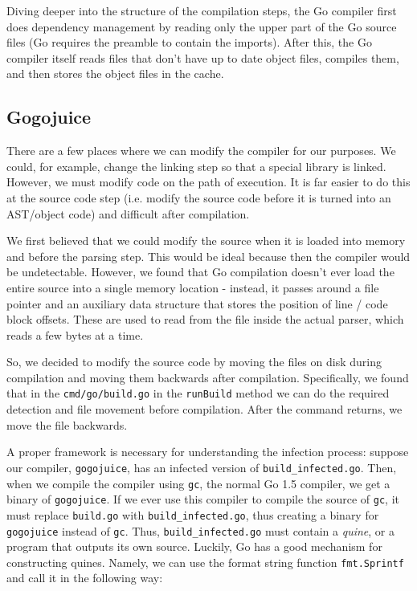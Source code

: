 \documentclass[10pt]{sigplanconf}
\begin{document}
Diving deeper into the structure of the compilation steps, the Go compiler first does dependency management by reading only the upper part of the Go source files (Go requires the preamble to contain the imports). After this, the Go compiler itself reads files that don't have up to date object files, compiles them, and then stores the object files in the cache. 

\subsection{Gogojuice}
There are a few places where we can modify the compiler for our purposes. We could, for example, change the linking step so that a special library is linked. However, we must modify code on the path of execution. It is far easier to do this at the source code step (i.e. modify the source code before it is turned into an AST/object code) and difficult after compilation. 

\smallskip

We first believed that we could modify the source when it is loaded into memory and before the parsing step. This would be ideal because then the compiler would be undetectable. However, we found that Go compilation doesn't ever load the entire source into a single memory location - instead, it passes around a file pointer and an auxiliary data structure that stores the position of line / code block offsets. These are used to read from the file inside the actual parser, which reads a few bytes at a time.

\smallskip

So, we decided to modify the source code by moving the files on disk during compilation and moving them backwards after compilation. Specifically, we found that in the \texttt{cmd/go/build.go} in the \texttt{runBuild} method we can do the required detection and file movement before compilation. After the command returns, we move the file backwards. 

\smallskip

A proper framework is necessary for understanding the infection process: suppose our compiler, \texttt{gogojuice}, has an infected version of \texttt{build\_infected.go}. Then, when we compile the compiler using \texttt{gc}, the normal Go 1.5 compiler, we get a binary of \texttt{gogojuice}. If we ever use this compiler to compile the source of \texttt{gc}, it must replace \texttt{build.go} with \texttt{build\_infected.go}, thus creating a binary for \texttt{gogojuice} instead of \texttt{gc}. Thus, \texttt{build\_infected.go} must contain a \emph{quine}, or a program that outputs its own source. Luckily, Go has a good mechanism for constructing quines. Namely, we can use the format string function \texttt{fmt.Sprintf} and call it in the following way:
\end{document}
